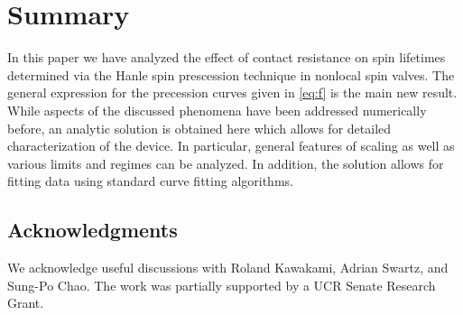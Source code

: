 \section{Summary}
\label{s:summary}

In this paper we have analyzed the effect of contact resistance
on spin lifetimes determined via the Hanle spin prescession technique in nonlocal spin valves.
The general expression for the precession curves given in \cref{eq:f} is the main new result.
While aspects of the discussed phenomena have been addressed numerically before,
an analytic solution is obtained here which allows for detailed characterization of the device.
In particular, general features of scaling as well as various limits and regimes can be analyzed.
In addition, the solution allows for fitting data using standard curve fitting algorithms.

\subsection{Acknowledgments}

We acknowledge useful discussions with Roland Kawakami, Adrian Swartz, and Sung-Po Chao.
The work was partially supported by a UCR Senate Research Grant.
